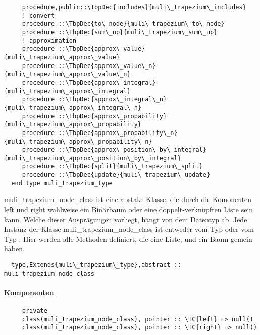 \begin{Verbatim}
     procedure,public::\TbpDec{includes}{muli\_trapezium\_includes}
     ! convert
     procedure ::\TbpDec{to\_node}{muli\_trapezium\_to\_node}
     procedure ::\TbpDec{sum\_up}{muli\_trapezium\_sum\_up}
     ! approximation
     procedure ::\TbpDec{approx\_value}{muli\_trapezium\_approx\_value}
     procedure ::\TbpDec{approx\_value\_n}{muli\_trapezium\_approx\_value\_n}
     procedure ::\TbpDec{approx\_integral}{muli\_trapezium\_approx\_integral}
     procedure ::\TbpDec{approx\_integral\_n}{muli\_trapezium\_approx\_integral\_n}
     procedure ::\TbpDec{approx\_propability}{muli\_trapezium\_approx\_propability}
     procedure ::\TbpDec{approx\_propability\_n}{muli\_trapezium\_approx\_propability\_n}
     procedure ::\TbpDec{approx\_position\_by\_integral}{muli\_trapezium\_approx\_position\_by\_integral}
     procedure ::\TbpDec{split}{muli\_trapezium\_split}
     procedure ::\TbpDec{update}{muli\_trapezium\_update}
  end type muli_trapezium_type
\end{Verbatim}
muli\_trapezium\_node\_class ist eine abstake Klasse, die durch die Komonenten left und right wahlweise ein Binärbaum oder eine doppelt-verknüpften Liste sein kann. Welche dieser Ausprägungen vorliegt, hängt von dem Datentyp ab. Jede Instanz der Klasse muli\_trapezium\_node\_class ist entweder vom Typ  oder vom Typ . Hier werden alle Methoden definiert, die eine Liste, und ein Baum gemein haben.
\begin{Verbatim}
  type,Extends{muli\_trapezium\_type},abstract :: muli_trapezium_node_class
\end{Verbatim}
\paragraph{Komponenten}
\begin{Verbatim}
     private
     class(muli_trapezium_node_class), pointer :: \TC{left} => null()
     class(muli_trapezium_node_class), pointer :: \TC{right} => null()
\end{Verbatim}
